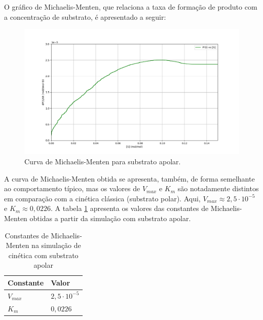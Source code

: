 \documentclass[12pt,oneside]{report}
\begin{document}
O gráfico de Michaelis-Menten, que relaciona a taxa de formação de produto com a concentração de substrato, é apresentado a seguir:

\begin{figure}[H]
    \centering
    \includegraphics[width=1\textwidth]{MM_apolar_curve.png}
    \caption{\small Curva de Michaelis-Menten para substrato apolar.}
    \label{fig:MM_apolar_curve}
\end{figure}

A curva de Michaelis-Menten obtida se apresenta, também, de forma semelhante ao comportamento típico, mas os valores de $V_{max}$ e $K_m$ são notadamente distintos em comparação com a cinética clássica (substrato polar). Aqui, $V_{max} \approx 2{,}5 \cdot 10^{-5}$ e $K_m \approx 0{,}0226$. A tabela \ref{tab:params_MM_apolar} apresenta os valores das constantes de Michaelis-Menten obtidas a partir da simulação com substrato apolar.

\begin{table}[H]
    \centering
    \caption{Constantes de Michaelis-Menten na simulação de cinética com substrato apolar}
    \vspace{0.2cm}
    \begin{tabularx}{\textwidth}{X m{5cm}}
        \hline
        \textbf{Constante} & \textbf{Valor}        \\
        \hline
        $V_{max}$          & $2{,}5 \cdot 10^{-5}$ \\
        $K_m$              & $0{,}0226$            \\
        \hline
    \end{tabularx}
    \vspace{0.2cm}
    \label{tab:params_MM_apolar}
\end{table}
\end{document}
